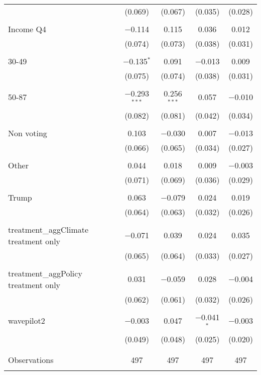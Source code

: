 \begin{tabular}{@{\extracolsep{5pt}}lcccc}
  & (0.069) & (0.067) & (0.035) & (0.028) \\ 
  & & & & \\ 
 Income Q4 & $-$0.114 & 0.115 & 0.036 & 0.012 \\ 
  & (0.074) & (0.073) & (0.038) & (0.031) \\ 
  & & & & \\ 
 30-49 & $-$0.135$^{*}$ & 0.091 & $-$0.013 & 0.009 \\ 
  & (0.075) & (0.074) & (0.038) & (0.031) \\ 
  & & & & \\ 
 50-87 & $-$0.293$^{***}$ & 0.256$^{***}$ & 0.057 & $-$0.010 \\ 
  & (0.082) & (0.081) & (0.042) & (0.034) \\ 
  & & & & \\ 
 Non voting & 0.103 & $-$0.030 & 0.007 & $-$0.013 \\ 
  & (0.066) & (0.065) & (0.034) & (0.027) \\ 
  & & & & \\ 
 Other & 0.044 & 0.018 & 0.009 & $-$0.003 \\ 
  & (0.071) & (0.069) & (0.036) & (0.029) \\ 
  & & & & \\ 
 Trump & 0.063 & $-$0.079 & 0.024 & 0.019 \\ 
  & (0.064) & (0.063) & (0.032) & (0.026) \\ 
  & & & & \\ 
 treatment\_aggClimate treatment only & $-$0.071 & 0.039 & 0.024 & 0.035 \\ 
  & (0.065) & (0.064) & (0.033) & (0.027) \\ 
  & & & & \\ 
 treatment\_aggPolicy treatment only & 0.031 & $-$0.059 & 0.028 & $-$0.004 \\ 
  & (0.062) & (0.061) & (0.032) & (0.026) \\ 
  & & & & \\ 
 wavepilot2 & $-$0.003 & 0.047 & $-$0.041$^{*}$ & $-$0.003 \\ 
  & (0.049) & (0.048) & (0.025) & (0.020) \\ 
  & & & & \\ 
\hline \\[-1.8ex] 

Observations & 497 & 497 & 497 & 497 \\ 
\hline 
\hline \\[-1.8ex] 
\end{tabular} 